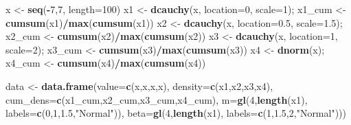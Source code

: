 \documentclass[]{book}
\newenvironment{Shaded}{\begin{snugshade}}{\end{snugshade}}
\newcommand{\KeywordTok}[1]{\textcolor[rgb]{0.13,0.29,0.53}{\textbf{#1}}}
\newcommand{\DataTypeTok}[1]{\textcolor[rgb]{0.13,0.29,0.53}{#1}}
\newcommand{\DecValTok}[1]{\textcolor[rgb]{0.00,0.00,0.81}{#1}}
\newcommand{\FloatTok}[1]{\textcolor[rgb]{0.00,0.00,0.81}{#1}}
\newcommand{\StringTok}[1]{\textcolor[rgb]{0.31,0.60,0.02}{#1}}
\newcommand{\OperatorTok}[1]{\textcolor[rgb]{0.81,0.36,0.00}{\textbf{#1}}}
\newcommand{\NormalTok}[1]{#1}
\begin{document}
\begin{Shaded}
\begin{Highlighting}[]
\NormalTok{x <-}\StringTok{ }\KeywordTok{seq}\NormalTok{(}\OperatorTok{-}\DecValTok{7}\NormalTok{,}\DecValTok{7}\NormalTok{, }\DataTypeTok{length=}\DecValTok{100}\NormalTok{)}
\NormalTok{x1 <-}\StringTok{ }\KeywordTok{dcauchy}\NormalTok{(x, }\DataTypeTok{location=}\DecValTok{0}\NormalTok{, }\DataTypeTok{scale=}\DecValTok{1}\NormalTok{); x1_cum <-}\StringTok{ }\KeywordTok{cumsum}\NormalTok{(x1)}\OperatorTok{/}\KeywordTok{max}\NormalTok{(}\KeywordTok{cumsum}\NormalTok{(x1))}
\NormalTok{x2 <-}\StringTok{ }\KeywordTok{dcauchy}\NormalTok{(x, }\DataTypeTok{location=}\FloatTok{0.5}\NormalTok{, }\DataTypeTok{scale=}\FloatTok{1.5}\NormalTok{); x2_cum <-}\StringTok{ }\KeywordTok{cumsum}\NormalTok{(x2)}\OperatorTok{/}\KeywordTok{max}\NormalTok{(}\KeywordTok{cumsum}\NormalTok{(x2))}
\NormalTok{x3 <-}\StringTok{ }\KeywordTok{dcauchy}\NormalTok{(x, }\DataTypeTok{location=}\DecValTok{1}\NormalTok{, }\DataTypeTok{scale=}\DecValTok{2}\NormalTok{); x3_cum <-}\StringTok{ }\KeywordTok{cumsum}\NormalTok{(x3)}\OperatorTok{/}\KeywordTok{max}\NormalTok{(}\KeywordTok{cumsum}\NormalTok{(x3))}
\NormalTok{x4 <-}\StringTok{ }\KeywordTok{dnorm}\NormalTok{(x); x4_cum <-}\StringTok{ }\KeywordTok{cumsum}\NormalTok{(x4)}\OperatorTok{/}\KeywordTok{max}\NormalTok{(}\KeywordTok{cumsum}\NormalTok{(x4))}

\NormalTok{data <-}\StringTok{ }\KeywordTok{data.frame}\NormalTok{(}\DataTypeTok{value=}\KeywordTok{c}\NormalTok{(x,x,x,x),}
                   \DataTypeTok{density=}\KeywordTok{c}\NormalTok{(x1,x2,x3,x4),}
                   \DataTypeTok{cum_dens=}\KeywordTok{c}\NormalTok{(x1_cum,x2_cum,x3_cum,x4_cum),}
                   \DataTypeTok{m=}\KeywordTok{gl}\NormalTok{(}\DecValTok{4}\NormalTok{,}\KeywordTok{length}\NormalTok{(x1),}
                       \DataTypeTok{labels=}\KeywordTok{c}\NormalTok{(}\DecValTok{0}\NormalTok{,}\DecValTok{1}\NormalTok{,}\FloatTok{1.5}\NormalTok{,}\StringTok{"Normal"}\NormalTok{)),}
                   \DataTypeTok{beta=}\KeywordTok{gl}\NormalTok{(}\DecValTok{4}\NormalTok{,}\KeywordTok{length}\NormalTok{(x1),}
                       \DataTypeTok{labels=}\KeywordTok{c}\NormalTok{(}\DecValTok{1}\NormalTok{,}\FloatTok{1.5}\NormalTok{,}\DecValTok{2}\NormalTok{,}\StringTok{"Normal"}\NormalTok{)))}


\end{Highlighting}
\end{Shaded}
\end{document}
